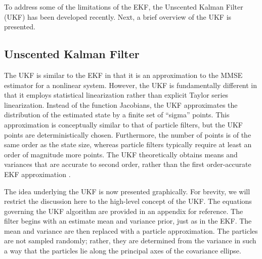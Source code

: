 To address some of the limitations of the EKF, the Unscented Kalman Filter (UKF) has been developed recently.
Next, a brief overview of the UKF is presented.

\subsection{Unscented Kalman Filter}

The UKF is similar to the EKF in that it is an approximation to the MMSE estimator for a nonlinear system.
However, the UKF is fundamentally different in that it employs statistical linearization rather than explicit Taylor series linearization.
Instead of the function Jacobians, the UKF approximates the distribution of the estimated state by a finite set of ``sigma'' points.
This approximation is conceptually similar to that of particle filters, but the UKF points are deterministically chosen. Furthermore, the number of points is of the same order as the state size, whereas particle filters typically require at least an order of magnitude more points.
The UKF theoretically obtains means and variances that are accurate to second order, rather than the first order-accurate EKF approximation \cite{julier1997}.

The idea underlying the UKF is now presented graphically.
For brevity, we will restrict the discussion here to the high-level concept of the UKF.
The equations governing the UKF algorithm are provided in an appendix for reference.
The filter begins with an estimate mean and variance prior, just as in the EKF.
The mean and variance are then replaced with a particle approximation.
The particles are not sampled randomly; rather, they are determined from the variance in such a way that the particles lie along the principal axes of the covariance ellipse.

